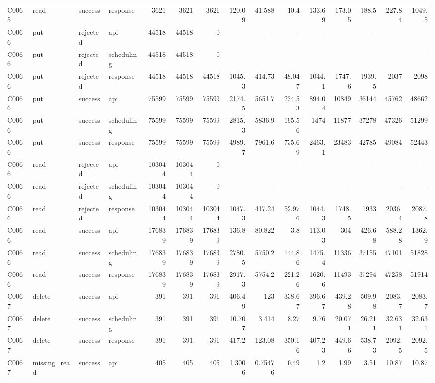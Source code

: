 \begin{landscape}
\begin{longtable}{llllrrrrrrrrrrr}
C0065 & read & success & response & 3621 & 3621 & 3621 & 120.09 & 41.588 & 10.4 & 133.69 & 173.05 & 188.5 & 227.84 & 1049.5\\
C0066 & put & rejected & api & 44518 & 44518 & 0 & -- & -- & -- & -- & -- & -- & -- & --\\
C0066 & put & rejected & scheduling & 44518 & 44518 & 0 & -- & -- & -- & -- & -- & -- & -- & --\\
C0066 & put & rejected & response & 44518 & 44518 & 44518 & 1045.3 & 414.73 & 48.047 & 1044.1 & 1747.6 & 1939.5 & 2037 & 2098\\
C0066 & put & success & api & 75599 & 75599 & 75599 & 2174.5 & 5651.7 & 234.53 & 894.04 & 10849 & 36144 & 45762 & 48662\\
C0066 & put & success & scheduling & 75599 & 75599 & 75599 & 2815.3 & 5836.9 & 195.56 & 1474 & 11877 & 37278 & 47326 & 51299\\
C0066 & put & success & response & 75599 & 75599 & 75599 & 4989.7 & 7961.6 & 735.69 & 2463.1 & 23483 & 42785 & 49084 & 52443\\
C0066 & read & rejected & api & 103044 & 103044 & 0 & -- & -- & -- & -- & -- & -- & -- & --\\
C0066 & read & rejected & scheduling & 103044 & 103044 & 0 & -- & -- & -- & -- & -- & -- & -- & --\\
C0066 & read & rejected & response & 103044 & 103044 & 103044 & 1047.3 & 417.24 & 52.976 & 1044.3 & 1748.5 & 1933 & 2036.4 & 2087.8\\
C0066 & read & success & api & 176839 & 176839 & 176839 & 136.8 & 80.822 & 3.8 & 113.03 & 304 & 426.68 & 588.28 & 1362.9\\
C0066 & read & success & scheduling & 176839 & 176839 & 176839 & 2780.5 & 5750.2 & 144.86 & 1475.4 & 11336 & 37155 & 47101 & 51828\\
C0066 & read & success & response & 176839 & 176839 & 176839 & 2917.3 & 5754.2 & 221.26 & 1620.6 & 11493 & 37294 & 47258 & 51914\\
C0067 & delete & success & api & 391 & 391 & 391 & 406.49 & 123 & 338.67 & 396.67 & 439.28 & 509.98 & 2083.7 & 2083.7\\
C0067 & delete & success & scheduling & 391 & 391 & 391 & 10.707 & 3.414 & 8.27 & 9.76 & 20.071 & 26.211 & 32.631 & 32.631\\
C0067 & delete & success & response & 391 & 391 & 391 & 417.2 & 123.08 & 350.16 & 407.23 & 449.66 & 538.73 & 2092.5 & 2092.5\\
C0067 & missing\_\allowbreak{}read & success & api & 405 & 405 & 405 & 1.3006 & 0.75476 & 0.49 & 1.2 & 1.99 & 3.51 & 10.87 & 10.87\\

\end{longtable}
\end{landscape}
